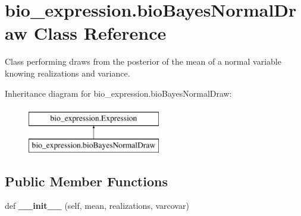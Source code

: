 \hypertarget{classbio__expression_1_1bio_bayes_normal_draw}{}\section{bio\+\_\+expression.\+bio\+Bayes\+Normal\+Draw Class Reference}
\label{classbio__expression_1_1bio_bayes_normal_draw}


Class performing draws from the posterior of the mean of a normal variable knowing realizations and variance.  


Inheritance diagram for bio\+\_\+expression.\+bio\+Bayes\+Normal\+Draw\+:\begin{figure}[H]
\begin{center}
\leavevmode
\includegraphics[height=2.000000cm]{classbio__expression_1_1bio_bayes_normal_draw}
\end{center}
\end{figure}
\subsection*{Public Member Functions}
\begin{DoxyCompactItemize}
\item 
def {\bfseries \+\_\+\+\_\+init\+\_\+\+\_\+} (self, mean, realizations, varcovar)\hypertarget{classbio__expression_1_1bio_bayes_normal_draw_abe042eac39764a2f7c2644593c68a4af}{}\label{classbio__expression_1_1bio_bayes_normal_draw_abe042eac39764a2f7c2644593c68a4af}

\end{DoxyCompactItemize}
